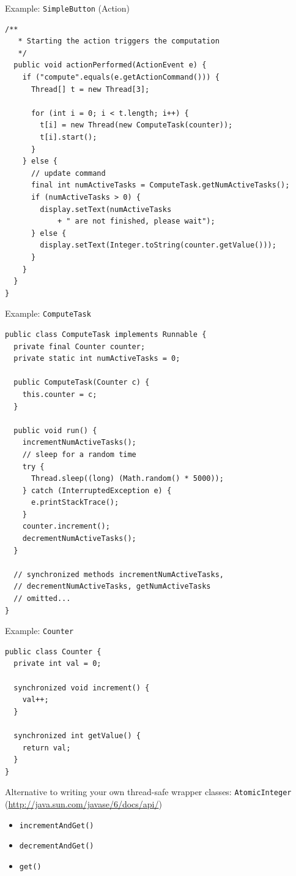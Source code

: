 \begin{frame}[fragile]{Example: \lstinline{SimpleButton} (Action)}
\begin{lstlisting}[basicstyle=\fontsize{7}{9}\selectfont\ttfamily]
  /**
   * Starting the action triggers the computation
   */
  public void actionPerformed(ActionEvent e) {
    if ("compute".equals(e.getActionCommand())) {
      Thread[] t = new Thread[3];

      for (int i = 0; i < t.length; i++) {
        t[i] = new Thread(new ComputeTask(counter));
        t[i].start();
      }
    } else {
      // update command
      final int numActiveTasks = ComputeTask.getNumActiveTasks();
      if (numActiveTasks > 0) {
        display.setText(numActiveTasks
            + " are not finished, please wait");
      } else {
        display.setText(Integer.toString(counter.getValue()));
      }
    }
  }
}
\end{lstlisting}
\end{frame}

\begin{frame}[fragile]{Example: \lstinline{ComputeTask}}
\begin{lstlisting}[basicstyle=\fontsize{7}{9}\selectfont\ttfamily]
public class ComputeTask implements Runnable {
  private final Counter counter;
  private static int numActiveTasks = 0;

  public ComputeTask(Counter c) {
    this.counter = c;
  }

  public void run() {
    incrementNumActiveTasks();
    // sleep for a random time
    try {
      Thread.sleep((long) (Math.random() * 5000));
    } catch (InterruptedException e) {
      e.printStackTrace();
    }
    counter.increment();
    decrementNumActiveTasks();
  }

  // synchronized methods incrementNumActiveTasks, 
  // decrementNumActiveTasks, getNumActiveTasks
  // omitted...
}
\end{lstlisting}
\end{frame}

\begin{frame}[fragile]{Example: \lstinline{Counter}}
\begin{lstlisting}[basicstyle=\fontsize{7}{9}\selectfont\ttfamily]
public class Counter {
  private int val = 0;
  
  synchronized void increment() {
    val++;
  }
  
  synchronized int getValue() {
    return val;
  }
}
\end{lstlisting}


  Alternative to writing your own thread-safe wrapper classes:
  \lstinline!AtomicInteger! (\url{http://java.sun.com/javase/6/docs/api/})
  \begin{itemize}
  \item \lstinline!incrementAndGet()!
  \item \lstinline!decrementAndGet()!
  \item \lstinline!get()!
  \end{itemize}
\end{frame}

